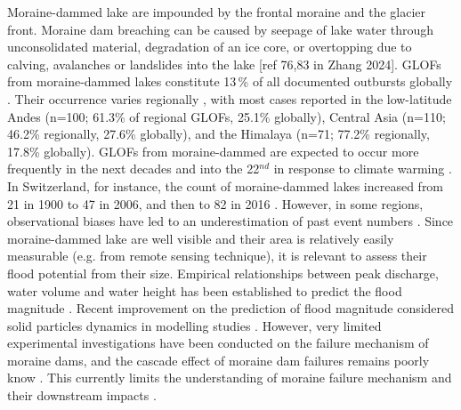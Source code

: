 Moraine-dammed lake are impounded by the frontal moraine and the glacier front. Moraine dam breaching can be caused by seepage of lake water through unconsolidated material, degradation of an ice core, or overtopping due to calving, avalanches or landslides into the lake [ref 76,83 in Zhang 2024]. GLOFs from moraine-dammed lakes constitute 13\,\% of all documented outbursts globally \citep{Lutzow&al2023}. Their occurrence varies regionally \citep{Zhang&al2024}, with most cases reported in the low-latitude Andes (n=100; 61.3\% of regional GLOFs, 25.1\% globally), Central Asia (n=110; 46.2\% regionally, 27.6\% globally), and the Himalaya (n=71; 77.2\% regionally, 17.8\% globally). GLOFs from moraine-dammed are expected to occur more frequently in the next decades and into the 22$^{nd}$ in response to climate warming \citep{Harrison&al2018}. In Switzerland, for instance, the count of moraine-dammed lakes increased from 21 in 1900 to 47 in 2006, and then to 82 in 2016 \cite{Zhang&al2024}. However, in some regions, observational biases have led to an underestimation of past event numbers \citep{Veh&al2022}. %
Since moraine-dammed lake are well visible and their area is relatively easily measurable (e.g. from remote sensing technique), it is relevant to assess their flood potential from their size. Empirical relationships between peak discharge, water volume and water height has been established to predict the flood magnitude \citep[see][for a review on moraine-dammed lake failure]{Neupane&al2019}. Recent improvement on the prediction of flood magnitude considered solid particles dynamics in modelling studies \citep[e.g.][]{Mergili&al2018}. However, very limited experimental investigations have been conducted on the failure mechanism of moraine dams, and the cascade effect of moraine dam failures remains poorly know \citep{Somos-Valenzuela&al2016}. This currently limits the understanding of moraine failure mechanism and their downstream impacts \citep{Neupane&al2019}. 





